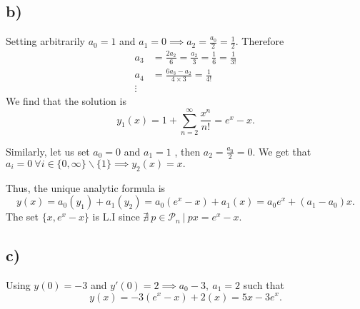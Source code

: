 \documentclass[
	12pt,
	]{article}
\theoremstyle{definition}
\theoremstyle{definition}
\theoremstyle{definition}
\theoremstyle{definition}
\theoremstyle{definition}
\theoremstyle{example}
\theoremstyle{note}
\theoremstyle{remark}
\theoremstyle{example}
\begin{document}
			\subsection*{b) }	
			Setting arbitrarily $a_{0} =1$ and $a_{1} =0 \implies a_{2} = \frac{a_{0}}{2} = \frac12$. Therefore 
			\begin{align*}
				a_{3} &= \frac{2a_{2}}{6} = \frac{a_{2}}{3} = \frac{1}{6} = \frac{1}{3!} \\
				a_{4} &= \frac{6a_{3} - a_{2}}{4\times 3} = \frac{1}{4!} \\
				\vdots
			\end{align*}	
			We find that the solution is $$ y_{1}(x) = 1 + \sum_{n=2}^{\infty} \frac{x^{n}}{n!} = e^{x} - x.$$
			
			\noindent Similarly, let us set $a_{0} = 0 $ and $a_{1} = 1$ , then $a_{2} = \frac{a_{0}}{2} = 0$. We get that $a_{i} = 0 \ \forall i \in \{0,\infty\}\backslash \{1\} \implies y_{2}(x) = x.$
			
			Thus, the unique analytic formula is 
			$$ y(x) = a_{0}(y_{1}) + a_{1}(y_{2}) = a_{0}(e^{x} -x) + a_{1}(x) = a_{0}e^{x} + (a_{1}-a_{0})x.$$
			The set $\{x, e^{x}-x\}$ is L.I since $\nexists \ p \in \mathcal{P}_{n} \ | \ px = e^{x} -x.$
		\subsection*{c) }
			Using $y(0) = -3$ and $y'(0) =2 \implies a_{0}-3 , \ a_{1} = 2$ such that 
			$$ y(x) = -3(e^{x} -x) + 2(x) = 5x -3e^{x}.$$ 
	
\end{document}
